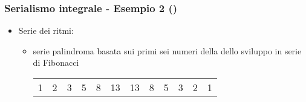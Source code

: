 \begin{frame}
    \frametitle{Serialismo integrale - Esempio 2 ()}

    \begin{itemize}

        \item Serie dei ritmi:

            \begin{itemize}

                \item serie palindroma basata sui primi sei numeri della
                      dello sviluppo in serie di Fibonacci

                      \begin{center}
                          \begin{tabular}{*{12}{r}}
                            1 & 2 & 3 & 5 & 8 & 13 & 13 & 8 & 5 & 3 & 2 & 1\\
                          \end{tabular}
                      \end{center}

         \end{itemize}

   \end{itemize}

\end{frame}

